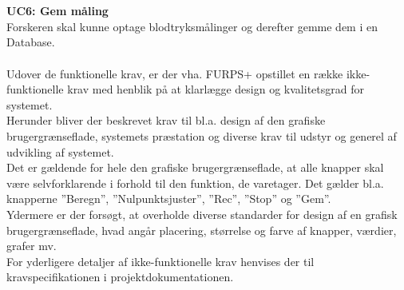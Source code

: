 \\\\
\textbf{UC6: Gem måling}\\
Forskeren skal kunne optage blodtryksmålinger og derefter gemme dem i en Database. 
\\\\
Udover de funktionelle krav, er der vha. FURPS+ opstillet en række ikke-funktionelle krav med henblik på at klarlægge design og kvalitetsgrad for systemet. \\
Herunder bliver der beskrevet krav til bl.a. design af den grafiske brugergrænseflade, systemets præstation og diverse krav til udstyr og generel  af udvikling af systemet.\\
Det er gældende for hele den grafiske brugergrænseflade, at alle knapper skal være selvforklarende i forhold til den funktion, de varetager. Det gælder bl.a. knapperne ”Beregn”, ”Nulpunktsjuster”, ”Rec”, ”Stop” og ”Gem”.\\
Ydermere er der forsøgt, at overholde diverse standarder for design af en grafisk brugergrænseflade, hvad angår placering, størrelse og farve af knapper, værdier, grafer mv.\\
For yderligere detaljer af ikke-funktionelle krav henvises der til kravspecifikationen i projektdokumentationen.



 



